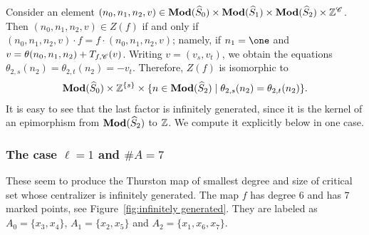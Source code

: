 \documentclass{amsart}
\begin{document}
Consider an element
$(n_0,n_1,n_2,v)\in \mathbf{\relax Mod}(\widehat S_0)\times\mathbf{\relax Mod}(\widehat
S_1)\times\mathbf{\relax Mod}(\widehat S_2)\times{\mathbb Z}^{\mathscr C}$. Then
$(n_0,n_1,n_2,v)\in Z(f)$ if and only if
$(n_0,n_1,n_2,v)\cdot f=f\cdot (n_0,n_1,n_2,v)$; namely, if $n_1=\one$
and $v=\theta(n_0,n_1,n_2)+T_{f,{\mathscr C}}(v)$. Writing $v=(v_s,v_t)$, we
obtain the equations $\theta_{2,s}(n_2)=\theta_{2,t}(n_2)=-v_t$.
Therefore, $Z(f)$ is isomorphic to
\[\mathbf{\relax Mod}(\widehat S_0)\times {\mathbb Z}^{\{s\}}\times  \{n\in \mathbf{\relax Mod}(\widehat S_2)\mid \theta_{2,s}(n_2)= \theta_{2,t}(n_2)\}.
\]
It is easy to see that the last factor is infinitely generated, since
it is the kernel of an epimorphism from $\mathbf{\relax Mod}(\widehat S_2)$ to ${\mathbb Z}$. We
compute it explicitly below in one case.

\subsubsection{The case $\ell=1$ and $\#A=7$} 
These seem to produce the Thurston map of smallest degree and size of
critical set whose centralizer is infinitely generated. The map $f$
has degree $6$ and has $7$ marked points, see
Figure~\ref{fig:infinitely generated}. They are labeled as
$A_0=\{x_3,x_4\}$, $A_1=\{x_2,x_5\}$ and $A_2=\{x_1,x_6,x_7\}$.
\end{document}
